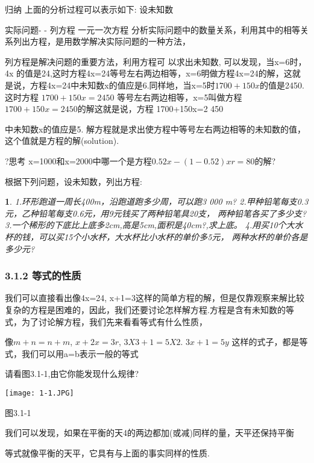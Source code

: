 \documentclass[11pt]{article}
\newtheorem{exercise}{ }
\begin{document}



归纳
上面的分析过程可以表示如下:
设未知数

实际问题- -
列方程
一元一次方程
分析实际问题中的数量关系，利用其中的相等关系列出方程，是用数学解决实际问题的一种方法，

列方程是解决问题的重要方法，利用方程可  以求出未知数,
可以发现，当x=6时，4x 的值是24,这时方程4x=24等号左右两边相等，x=6明做方程4x=24的解，这就是说，方程4x=24中未知数x的值应是6.同样地，当x=5时$1700+150x$的值是2450. 这时方程
$1700+150x=2450$
等号左右两边相等，x=5叫做方程$1700+150x=2450$的解这就是说，方程
1700+150x=2 450

中未知数x的值应是5.
解方程就是求出使方程中等号左右两边相等的未知数的值，这个值就是方程的解(solution).

?思考
x=1000和x=2000中哪一个是方程$0.52x- (1- 0. 52)xr= 80$的解?

根据下列问题，设未知数，列出方程:
\begin{exercise}
1.环形跑道一周长400m，沿跑道跑多少周，可以跑3 000 m?
2.甲种铅笔每支0.3元，乙种铅笔每支0.6元，用9元钱买了两种铅笔具20支，
两种铅笔各买了多少支?
3.一个稀形的下底比上底多2cm,高是5cm,面积是40cm?,求上底。
4.用买10个大水杯的钱，可以买15个小水杯，大水杯比小水杯的单价多5元，
两种水杯的单价各是多少元?
\end{exercise}


\subsubsection*{3.1.2 等式的性质}

我们可以直接看出像4x=24, x+1=3这样的简单方程的解，但是仅靠观察来解比较复杂的方程是困难的，因此，我们还要讨论怎样解方程.方程是含有未知数的等式，为了讨论解方程，我们先来看看等式有什么性质，

像$m+n=n+m$, $x+2x=3r$, $3X3+1=5X2$. $3x+1=5y$ 这样的式子，都是等式，我们可以用a=b表示一般的等式

请看图3.1-1,由它你能发现什么规律?
\begin{center}
  \texttt{[image: 1-1.JPG]}\\
\end{center}
图3.1-1

我们可以发现，如果在平衡的天4的两边都加(或减)同样的量，天平还保持平衡

等式就像平衡的天平，它具有与上面的事实同样的性质.
\end{document}
